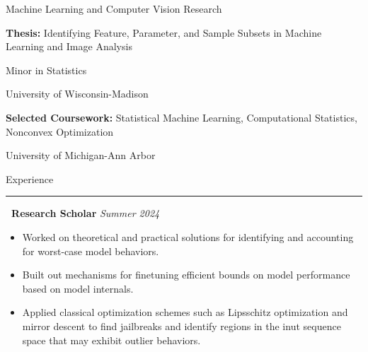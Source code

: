 \documentclass[]{article}
\begin{document}
	Machine Learning and Computer Vision Research
	
	\textbf{Thesis:} Identifying Feature, Parameter, and Sample Subsets in Machine Learning and Image Analysis
	
	Minor in Statistics
		

	{University of Wisconsin-Madison} 
	
		\textbf{Selected Coursework:} Statistical Machine Learning, Computational Statistics, Nonconvex Optimization

 
	{ University of Michigan-Ann Arbor }


\vspace{10pt}
{\LARGE Experience}
\hrule
\vspace{10pt}

 \newline
{\bf \ Research Scholar} \hfill \textit{Summer 2024}
\begin{itemize}[label={$\bullet$}]
	\item Worked on theoretical and practical solutions for identifying and accounting for worst-case model behaviors.
	\item Built out mechanisms for finetuning efficient bounds on model performance based on model internals.
	\item Applied classical optimization schemes such as Lipsschitz optimization and mirror descent to find jailbreaks and identify regions in the inut sequence space that may exhibit outlier behaviors.
\end{itemize} 
\end{document}
